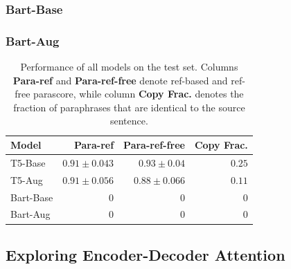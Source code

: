 \documentclass[fleqn,moreauthors,10pt]{ds_report}
\begin{document}
\subsubsection{Bart-Base}

\subsubsection{Bart-Aug}


\begin{table}[!h]
\centering
\caption{Performance of all models on the test set. Columns \textbf{Para-ref} and \textbf{Para-ref-free} denote ref-based and ref-free parascore, while column \textbf{Copy Frac.} denotes the fraction of paraphrases that are identical to the source sentence.}
\begin{tabular}{lrrr}
\textbf{Model} & \textbf{Para-ref} & \textbf{Para-ref-free} & \textbf{Copy Frac.}\\ \hline
T5-Base & $0.91 \pm 0.043$ & $0.93 \pm 0.04$ & $0.25$ \\
T5-Aug & $0.91 \pm 0.056$ & $0.88 \pm 0.066$ & $0.11$ \\
Bart-Base & 0 & 0 & 0 \\
Bart-Aug & 0 & 0 & 0 \\ \hline
\end{tabular}
\label{tab:models-performance}
\end{table}


\subsection{Exploring Encoder-Decoder Attention}
\end{document}
